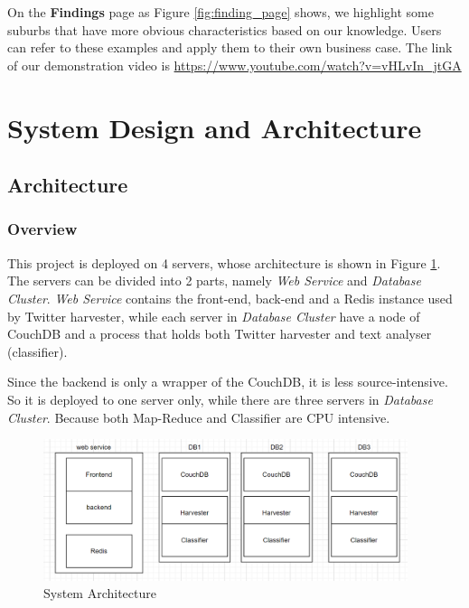 \documentclass[parskip=full, 11pt]{article}
\begin{document}
On the \textbf{Findings} page as Figure \ref{fig:finding_page} shows, we highlight some suburbs that have more obvious characteristics based on our knowledge. Users can refer to these examples and apply them to their own business case. 
The link of our demonstration video is \url{https://www.youtube.com/watch?v=vHLvIn_jtGA}

\section{System Design and Architecture}
\label{sec:architecture}

\subsection{Architecture}

\subsubsection{Overview}

This project is deployed on 4 servers, whose architecture is shown in Figure \ref{fig:architecture}.
The servers can be divided into 2 parts, namely \emph{Web Service} and \emph{Database Cluster}.
\emph{Web Service} contains the front-end, back-end and a Redis instance used by Twitter harvester,
while each server in \emph{Database Cluster} have a node of CouchDB and a process that holds both Twitter harvester and text analyser (classifier).

Since the backend is only a wrapper of the CouchDB, it is less source-intensive. So it is deployed to one server only, while there are three servers in \emph{Database Cluster}. Because both Map-Reduce and Classifier are CPU intensive.

\begin{figure}[H]
    \centering
    \includegraphics[width=0.95\textwidth]{Figures/architecture.png}
    \caption{System Architecture}
    \label{fig:architecture}
\end{figure}
\end{document}
